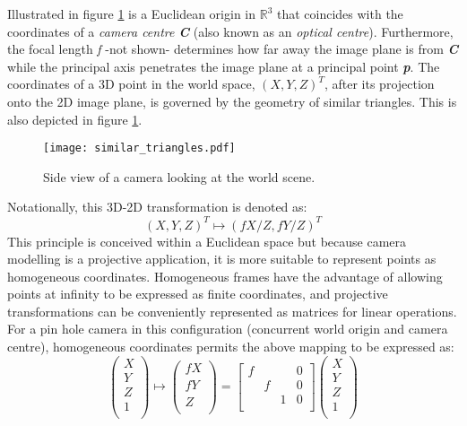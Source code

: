 \documentclass[12pt]{article}
\begin{document}
Illustrated in figure \ref{fig:simtri} is a Euclidean origin in $\mathbb{R}^3$ that coincides with the coordinates of a \textit{camera centre \textbf{C}} (also known as an \textit{optical centre}). Furthermore, the focal length \textit{f} -not shown- determines how far away the image plane is from \textit{\textbf{C}} while the principal axis penetrates the image plane at a principal point \textit{\textbf{p}}. The coordinates of a 3D point in the world space, $(X,Y,Z)^T$, after its projection onto the 2D image plane, is governed by the geometry of similar triangles. This is also depicted in figure \ref{fig:simtri}.
\begin {figure}
	\centering
\texttt{[image: similar\_triangles.pdf]}
\caption{Side view of a camera looking at the world scene. }
\label{fig:simtri}
\end{figure}
Notationally, this 3D-2D transformation is denoted as:
\begin{equation}
(X,Y,Z)^T \mapsto (\textit{f}X/Z,\textit{f}Y/Z)^T
\end{equation}
This principle is conceived within a Euclidean space but because camera modelling is a projective application, it is more suitable to represent points as homogeneous coordinates. Homogeneous frames have the advantage of allowing points at infinity to be expressed as finite coordinates, and projective transformations can be conveniently represented as matrices for linear operations. 
For a pin hole camera in this configuration (concurrent world origin and camera centre), homogeneous coordinates permits the above mapping to be expressed as:
\begin{equation}
\label{eq:map}
\left( \begin{array}{c} X \\ Y \\ Z \\ 1 \\ \end{array} \right) \mapsto \left( \begin{array}{c} \textit{f}X \\ \textit{f}Y \\ Z \\ \end{array}\right)  = 
\left[ {\begin{array}{cccc}
f & & & 0 \\
& f & & 0 \\
& & 1 & 0\\
\end{array} }\right] \left( \begin{array}{c} X \\ Y \\ Z \\ 1 \\ \end{array} \right)
\end{equation}
\end{document}
